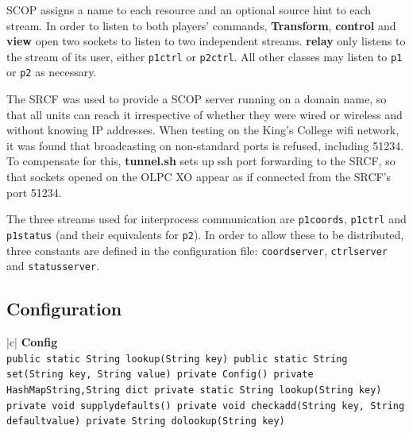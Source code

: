 \documentclass[12pt,a4,notitlepage]{report}
\renewcommand{\_}{\texttt{\symbol{95}}}
\newcommand{\<}{\texttt{\symbol{60}}}
\renewcommand{\>}{\texttt{\symbol{62}}}
\newcommand{\class}[1]{\textbf{#1}}
\newcommand{\scopendpoint}[1]{\texttt{#1}}
\newcommand{\variable}[1]{\texttt{#1}}
\begin{document}
SCOP assigns a name to each resource and an optional source hint to each stream. In order to listen to both players' commands, \class{Transform}, \class{control} and \class{view} open two sockets to listen to two independent streams. \class{relay} only listens to the stream of its user, either \scopendpoint{p1ctrl} or \scopendpoint{p2ctrl}. All other classes may listen to \scopendpoint{p1} or \scopendpoint{p2} as necessary.

The SRCF was used to provide a SCOP server running on a domain name, so that all units can reach it irrespective of whether they were wired or wireless and without knowing IP addresses. When testing on the King's College wifi network, it was found that broadcasting on non-standard ports is refused, including 51234. To compensate for this, \class{tunnel.sh} sets up ssh port forwarding to the SRCF, so that sockets opened on the OLPC XO appear as if connected from the SRCF's port 51234.

The three streams used for interprocess communication are \scopendpoint{p1coords}, \scopendpoint{p1ctrl} and \scopendpoint{p1status} (and their equivalents for \scopendpoint{p2}). In order to allow these to be distributed, three constants are defined in the configuration file: \variable{coordserver}, \variable{ctrlserver} and \variable{statusserver}. 

\subsection{Configuration}

\begin{tabular}{|c|} \hline 
\class{Config} \\ \hline
{}
{\variable{public static String lookup(String key) \newline
public static String set(String key, String value) \newline
private Config() \newline
private HashMap\<String,String\> dict \newline
private static String lookup(String key) \newline
private void supply\_defaults() \newline
private void check\_add(String key, String defaultvalue) \newline
private String do\_lookup(String key)
} } \\ \hline
\end{tabular}
\end{document}
